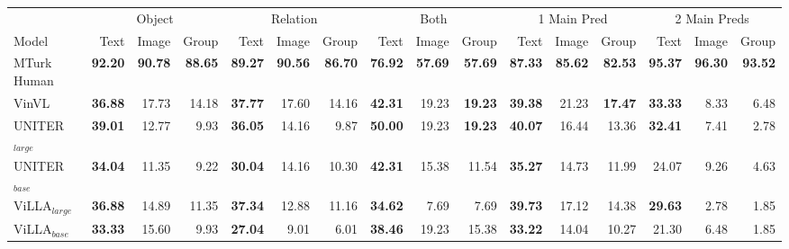 \begin{table}[ht]
    \centering
    \begin{adjustbox}{max width=\textwidth}
  \begin{tabular}{l|rrr|rrr|rrr|rrr|rrr}
    \toprule
     &
      \multicolumn{3}{c|}{Object} &
      \multicolumn{3}{c|}{Relation} &
      \multicolumn{3}{c|}{Both} &
      \multicolumn{3}{c|}{1 Main Pred} &
      \multicolumn{3}{c}{2 Main Preds}\\
    Model & Text & Image & Group & Text & Image & Group & Text & Image & Group & Text & Image & Group & Text & Image & Group \\\midrule
 MTurk Human                  & \textbf{92.20} & \textbf{90.78} & \textbf{88.65} & \textbf{89.27} & \textbf{90.56} & \textbf{86.70} & \textbf{76.92} & \textbf{57.69} & \textbf{57.69} & \textbf{87.33} & \textbf{85.62} & \textbf{82.53} & \textbf{95.37} & \textbf{96.30} & \textbf{93.52} \\
 VinVL                        & \textbf{36.88} & 17.73          & 14.18          & \textbf{37.77} & 17.60          & 14.16          & \textbf{42.31} & 19.23          & \textbf{19.23} & \textbf{39.38} & 21.23          & \textbf{17.47} & \textbf{33.33} & 8.33           & 6.48           \\
 UNITER$_{large}$             & \textbf{39.01} & 12.77          & 9.93           & \textbf{36.05} & 14.16          & 9.87           & \textbf{50.00} & 19.23          & \textbf{19.23} & \textbf{40.07} & 16.44          & 13.36          & \textbf{32.41} & 7.41           & 2.78           \\
 UNITER$_{base}$              & \textbf{34.04} & 11.35          & 9.22           & \textbf{30.04} & 14.16          & 10.30          & \textbf{42.31} & 15.38          & 11.54          & \textbf{35.27} & 14.73          & 11.99          & 24.07          & 9.26           & 4.63           \\
 ViLLA$_{large}$              & \textbf{36.88} & 14.89          & 11.35          & \textbf{37.34} & 12.88          & 11.16          & \textbf{34.62} & 7.69           & 7.69           & \textbf{39.73} & 17.12          & 14.38          & \textbf{29.63} & 2.78           & 1.85           \\
 ViLLA$_{base}$               & \textbf{33.33} & 15.60          & 9.93           & \textbf{27.04} & 9.01           & 6.01           & \textbf{38.46} & 19.23          & 15.38          & \textbf{33.22} & 14.04          & 10.27          & 21.30          & 6.48           & 1.85           \\

\end{tabular}
\end{adjustbox}
\end{table}
